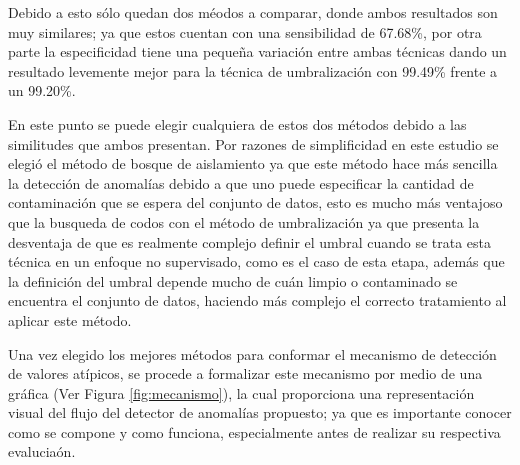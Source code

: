 \vspace{5mm} %

Debido a esto s\'{o}lo quedan dos m\'{e}odos a comparar, donde ambos resultados son muy similares; ya que estos cuentan con una sensibilidad de 67.68\%, por otra parte la especificidad tiene una peque\~{n}a variaci\'{o}n entre ambas t\'{e}cnicas dando un resultado levemente mejor para la t\'{e}cnica de umbralizaci\'{o}n con 99.49\% frente a un 99.20\%.

\vspace{5mm} %

En este punto se puede elegir cualquiera de estos dos m\'{e}todos debido a las similitudes que ambos presentan. Por razones de simplificidad en este estudio se elegi\'{o} el m\'{e}todo de bosque de aislamiento ya que este m\'{e}todo hace m\'{a}s sencilla la detecci\'{o}n de anomal\'{i}as debido a que uno puede especificar la cantidad de contaminaci\'{o}n que se espera del conjunto de datos, esto es mucho m\'{a}s ventajoso que la busqueda de codos con el m\'{e}todo de umbralizaci\'{o}n ya que presenta la desventaja de que es realmente complejo definir el umbral cuando se trata esta t\'{e}cnica en un enfoque no supervisado, como es el caso de esta etapa, adem\'{a}s que la definici\'{o}n del umbral depende mucho de cu\'{a}n limpio o contaminado se encuentra el conjunto de datos, haciendo m\'{a}s complejo el correcto tratamiento al aplicar este m\'{e}todo.

\vspace{5mm} %

Una vez elegido los mejores m\'{e}todos para conformar el mecanismo de detecci\'{o}n de valores at\'{i}picos, se procede a formalizar este mecanismo por medio de una gr\'{a}fica (Ver Figura \ref{fig:mecanismo}), la cual proporciona una representaci\'{o}n visual del flujo del detector de anomal\'{i}as propuesto; ya que es importante conocer como se compone y como funciona, especialmente antes de realizar su respectiva evalucia\'{o}n. 

